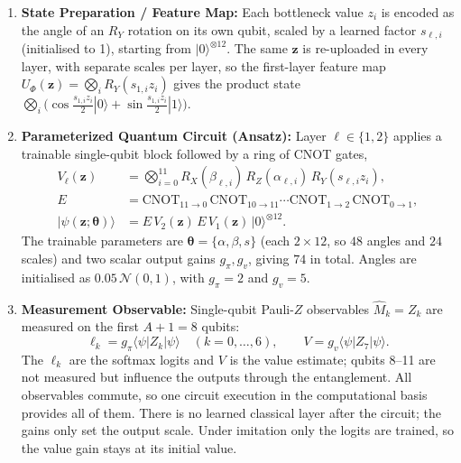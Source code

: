 \documentclass[10pt, a4paper]{article}
\begin{document}
\begin{enumerate}
    \item \textbf{State Preparation / Feature Map:} Each bottleneck value $z_i$ is encoded as the angle of an $R_Y$ rotation on its own qubit, scaled by a learned factor $s_{\ell,i}$ (initialised to 1), starting from $|0\rangle^{\otimes12}$. The same $\mathbf{z}$ is re-uploaded in every layer, with separate scales per layer, so the first-layer feature map $U_{\Phi}(\mathbf{z})=\bigotimes_i R_Y(s_{1,i}z_i)$ gives the product state $\bigotimes_i\big(\cos\tfrac{s_{1,i}z_i}{2}|0\rangle+\sin\tfrac{s_{1,i}z_i}{2}|1\rangle\big)$.
    \item \textbf{Parameterized Quantum Circuit (Ansatz):} Layer $\ell\in\{1,2\}$ applies a trainable single-qubit block followed by a ring of CNOT gates,
    \begin{align}
        V_\ell(\mathbf{z}) &= \bigotimes_{i=0}^{11} R_X(\beta_{\ell,i})\,R_Z(\alpha_{\ell,i})\,R_Y(s_{\ell,i}z_i),\\
        E &= \mathrm{CNOT}_{11\to0}\,\mathrm{CNOT}_{10\to11}\cdots\mathrm{CNOT}_{1\to2}\,\mathrm{CNOT}_{0\to1},\\
        |\psi(\mathbf{z};\boldsymbol{\theta})\rangle &= E\,V_2(\mathbf{z})\,E\,V_1(\mathbf{z})\,|0\rangle^{\otimes12}.
    \end{align}
    The trainable parameters are $\boldsymbol{\theta}=\{\alpha,\beta,s\}$ (each $2\times12$, so $48$ angles and $24$ scales) and two scalar output gains $g_\pi,g_v$, giving $74$ in total. Angles are initialised as $0.05\,\mathcal{N}(0,1)$, with $g_\pi=2$ and $g_v=5$.
    \item \textbf{Measurement Observable:} Single-qubit Pauli-$Z$ observables $\hat M_k=Z_k$ are measured on the first $A+1=8$ qubits:
    \begin{equation}
        \ell_k=g_\pi\langle\psi|Z_k|\psi\rangle\quad(k=0,\dots,6),\qquad V=g_v\langle\psi|Z_7|\psi\rangle .
    \end{equation}
    The $\ell_k$ are the softmax logits and $V$ is the value estimate; qubits 8--11 are not measured but influence the outputs through the entanglement. All observables commute, so one circuit execution in the computational basis provides all of them. There is no learned classical layer after the circuit; the gains only set the output scale. Under imitation only the logits are trained, so the value gain stays at its initial value.
\end{enumerate}
\end{document}
